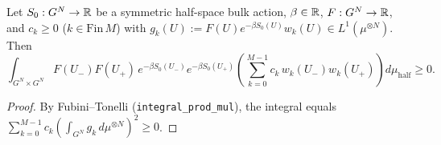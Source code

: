 \begin{theorem}
Let $S_0 : G^N \to \mathbb{R}$ be a symmetric half-space bulk action, $\beta \in \mathbb{R}$, $F : G^N \to \mathbb{R}$, and $c_k \ge 0$ ($k \in \mathrm{Fin}\,M$) with $g_k(U) := F(U) e^{-\beta S_0(U)} w_k(U) \in L^1(\mu^{\otimes N})$. Then
\begin{equation}
\int_{G^N \times G^N} F(U_-) F(U_+) \, e^{-\beta S_0(U_-)} e^{-\beta S_0(U_+)} \left(\sum_{k=0}^{M-1} c_k \, w_k(U_-) w_k(U_+)\right) d\mu_{\mathrm{half}} \ge 0.
\end{equation}
\end{theorem}

\begin{proof}
By Fubini--Tonelli (\texttt{integral\_prod\_mul}), the integral equals $\sum_{k=0}^{M-1} c_k \left(\int_{G^N} g_k \, d\mu^{\otimes N}\right)^2 \ge 0$.
\end{proof}
